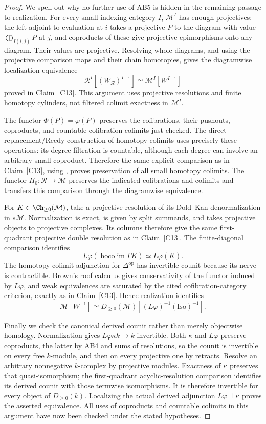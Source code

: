 \begin{proof}
We spell out why no further use of AB5 is hidden in the remaining passage to realization. For every small indexing category $I$, $\mathcal M^I$ has enough projectives: the left adjoint to evaluation at $i$ takes a projective $P$ to the diagram with value $\bigoplus_{I(i,j)}P$ at $j$, and coproducts of these give projective epimorphisms onto any diagram. Their values are projective. Resolving whole diagrams, and using the projective comparison maps and their chain homotopies, gives the diagramwise localization equivalence
\[
 \mathcal R^I[(W_{\mathcal R})^I{}^{-1}]
 \simeq \mathcal M^I[W^I{}^{-1}]
\]
proved in Claim~\ref{C13}. This argument uses projective resolutions and finite homotopy cylinders, not filtered colimit exactness in $\mathcal M^I$.

The functor $\Phi(P)=\varphi(P)$ preserves the cofibrations, their pushouts, coproducts, and countable cofibration colimits just checked. The direct-replacement/Reedy construction of homotopy colimits uses precisely these operations: its degree filtration is countable, although each degree can involve an arbitrary small coproduct. Therefore the same explicit comparison as in Claim~\ref{C13}, using \citet[Proposition 9.5.7 and Theorem 9.6.3]{RadulescuBanu2009}, proves preservation of all small homotopy colimits. The functor $H_0:\mathcal R\to\mathcal M$ preserves the indicated cofibrations and colimits and transfers this comparison through the diagramwise equivalence.

For $K\in\Ch_{\geq0}(\mathcal M)$, take a projective resolution of its Dold--Kan denormalization in $s\mathcal M$. Normalization is exact, is given by split summands, and takes projective objects to projective complexes. Its columns therefore give the same first-quadrant projective double resolution as in Claim~\ref{C13}. The finite-diagonal comparison identifies
\[
 L\varphi(\operatorname{hocolim}\Gamma K)\simeq L\varphi(K).
\]
The homotopy-colimit adjunction for $\Delta^{\mathrm{op}}$ has invertible counit because its nerve is contractible. Brown's roof calculus gives conservativity of the functor induced by $L\varphi$, and weak equivalences are saturated by the cited cofibration-category criterion, exactly as in Claim~\ref{C13}. Hence realization identifies
\[
 \mathcal M[W^{-1}]
 \simeq D_{\geq0}(\mathcal M)[(L\varphi)^{-1}(\mathrm{Iso})^{-1}].
\]

Finally we check the canonical derived counit rather than merely objectwise homology. Normalization gives $L\varphi\kappa k\to k$ invertible. Both $\kappa$ and $L\varphi$ preserve coproducts, the latter by AB4 and sums of resolutions, so the counit is invertible on every free $k$-module, and then on every projective one by retracts. Resolve an arbitrary nonnegative $k$-complex by projective modules. Exactness of $\kappa$ preserves that quasi-isomorphism; the first-quadrant acyclic-resolution comparison identifies its derived counit with those termwise isomorphisms. It is therefore invertible for every object of $D_{\geq0}(k)$. Localizing the actual derived adjunction $L\varphi\dashv\kappa$ proves the asserted equivalence. All uses of coproducts and countable colimits in this argument have now been checked under the stated hypotheses.
\end{proof}
